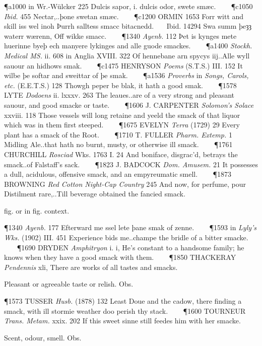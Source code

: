 \begin{description}[wide, labelwidth=!, labelindent=0pt]
\begin{myenumerate}
\P a1000 in  Wr.-Wülcker 225 Dulcis sapor, i. dulcis odor, swete smæc.    
\P c1050  \textit{Ibid.} 455 Nectar,..þone swetan smæc.    
\P c1200 ORMIN 1653 Forr  witt and skill iss wel inoh Þurrh salltess smacc bitacnedd.    Ibid. 14294 Swa summ þeȝȝ waterr wærenn, Off wikke smacc.    
\P 1340  \textit{Ayenb.} 112 Þet is kynges mete huerinne byeþ ech manyere lykinges and alle guode smackes.    
\P a1400 \textit{Stockh.  Medical MS.} ii. 608 in Anglia XVIII. 322 Of hennebane arn spycys iij..Alle wyll sauour an hidhows smak.    
\P c1475 HENRYSON  \textit{Poems} (S.T.S.) III. 152 It wilbe þe softar and sweittar of þe smak.    
\P a1536 \textit{Proverbs} in  \textit{Songs, Carols, etc.} (E.E.T.S.) 128 Thowgh peper be blak, it hath a good smak.    
\P 1578 LYTE  \textit{Dodoens} ii. lxxxv. 263 The leaues..are of a very strong and pleasant sauour, and good smacke or taste.    
\P 1606 J. CARPENTER  \textit{Solomon's Solace} xxviii. 118 Those vessels will long retaine and yeeld the smack of that liquor which was in them first steeped.    
\P 1675 EVELYN  \textit{Terra} (1729) 29 Every plant has a smack of the Root.    
\P 1710 T. FULLER  \textit{Pharm. Extemp.} 1 Midling Ale..that hath no burnt, musty, or otherwise ill smack.    
\P 1761 CHURCHILL \textit{Rosciad} Wks. 1763 I. 24 And  boniface, disgrac'd, betrays the smack..of Falstaff's sack.    
\P 1823 J. BADCOCK  \textit{Dom. Amusem.} 21 It possesses a dull, acidulous, offensive smack, and an empyreumatic smell.    
\P 1873 BROWNING  \textit{Red Cotton Night-Cap Country} 245 And now, for perfume, pour Distilment rare,..Till beverage obtained the fancied smack.

 fig. or in fig. context.

\P 1340  \textit{Ayenb.} 177 Efterward me ssel lete þane smak of zenne.    
\P 1593 in  \textit{Lyly's Wks.} (1902) III. 451 Experience bids me..champe the bridle of a bitter smacke.    
\P 1690 DRYDEN  \textit{Amphitryon} i. i, He's constant to a handsome family; he knows when they have a good smack with them.    
\P 1850 THACKERAY  \textit{Pendennis} xli, There are works of all tastes and smacks.

 Pleasant or agreeable taste or relish. Obs.

\P 1573 TUSSER  \textit{Husb.} (1878) 132 Least Doue and the cadow, there finding a smack, with ill stormie weather doo perish thy stack.    
\P 1600 TOURNEUR  \textit{Trans. Metam.} xxix. 202 If this sweet sinne still feedes him with her smacke.

 Scent, odour, smell. Obs.


\end{myenumerate}
\end{description}
